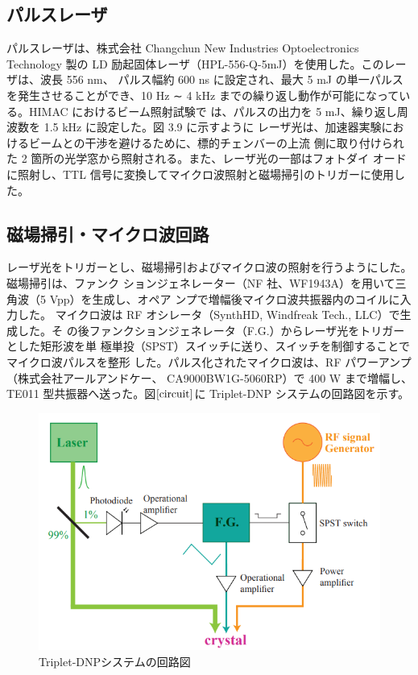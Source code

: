 \subsection{パルスレーザ}
パルスレーザは、株式会社 Changchun New Industries Optoelectronics Technology
製の LD 励起固体レーザ（HPL-556-Q-5mJ）を使用した。このレーザは、波長 556 nm、
パルス幅約 600 ns に設定され、最大 5 mJ の単一パルスを発生させることができ、10 Hz
∼ 4 kHz までの繰り返し動作が可能になっている。HIMAC におけるビーム照射試験で
は、パルスの出力を 5 mJ、繰り返し周波数を 1.5 kHz に設定した。図 3.9 に示すように
レーザ光は、加速器実験におけるビームとの干渉を避けるために、標的チェンバーの上流
側に取り付けられた 2 箇所の光学窓から照射される。また、レーザ光の一部はフォトダイ
オードに照射し、TTL 信号に変換してマイクロ波照射と磁場掃引のトリガーに使用した。

\subsection{磁場掃引・マイクロ波回路}
レーザ光をトリガーとし、磁場掃引およびマイクロ波の照射を行うようにした。磁場掃引は、ファンク
ションジェネレーター（NF 社、WF1943A）を用いて三角波（5 Vpp）を生成し、オペア
ンプで増幅後マイクロ波共振器内のコイルに入力した。
マイクロ波は RF オシレータ（SynthHD, Windfreak Tech., LLC）で生成した。そ
の後ファンクションジェネレータ（F.G.）からレーザ光をトリガーとした矩形波を単
極単投（SPST）スイッチに送り、スイッチを制御することでマイクロ波パルスを整形
した。パルス化されたマイクロ波は、RF パワーアンプ（株式会社アールアンドケー、
CA9000BW1G-5060RP）で 400 W まで増幅し、TE011 型共振器へ送った。図$\ref{circuit}$に
Triplet-DNP システムの回路図を示す。

\begin{figure}[ht]
  \centering
  \includegraphics[keepaspectratio, scale=0.8]
       {./chap2/fig/circuit.png}
  \caption{Triplet-DNPシステムの回路図}
  \label{circuit}
 \end{figure}

